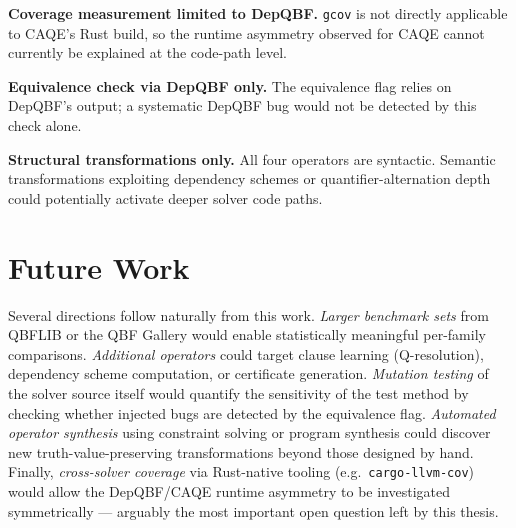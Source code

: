 \textbf{Coverage measurement limited to DepQBF.} \texttt{gcov} is
not directly applicable to CAQE's Rust build, so the runtime
asymmetry observed for CAQE cannot currently be explained at the
code-path level.

\textbf{Equivalence check via DepQBF only.} The equivalence flag
relies on DepQBF's output; a systematic DepQBF bug would not be
detected by this check alone.

\textbf{Structural transformations only.} All four operators are
syntactic. Semantic transformations exploiting dependency schemes
or quantifier-alternation depth could potentially activate deeper
solver code paths.


\section{Future Work}\label{sec:future}

Several directions follow naturally from this work.
\emph{Larger benchmark sets} from QBFLIB or the QBF Gallery would
enable statistically meaningful per-family comparisons.
\emph{Additional operators} could target clause learning
(Q-resolution), dependency scheme computation, or certificate
generation. \emph{Mutation testing} of the solver source itself
would quantify the sensitivity of the test method by checking
whether injected bugs are detected by the equivalence flag.
\emph{Automated operator synthesis} using constraint solving or
program synthesis could discover new truth-value-preserving
transformations beyond those designed by hand. Finally,
\emph{cross-solver coverage} via Rust-native tooling
(e.g.\ \texttt{cargo-llvm-cov}) would allow the DepQBF/CAQE runtime
asymmetry to be investigated symmetrically --- arguably the most
important open question left by this thesis.